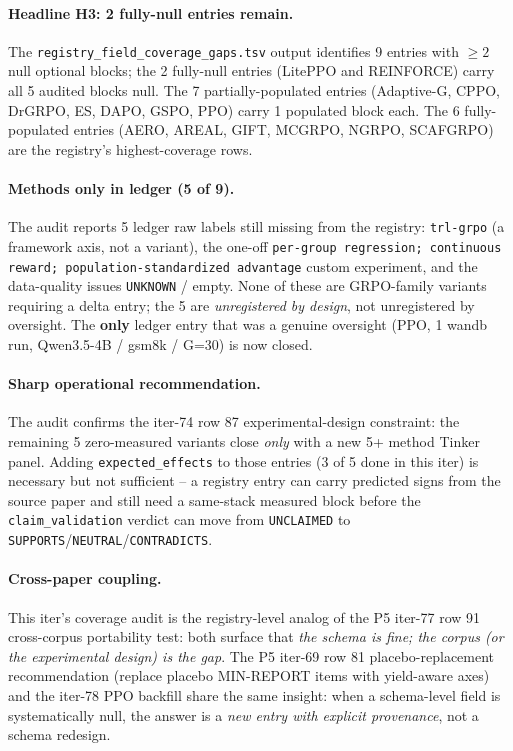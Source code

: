 \paragraph{Headline H3: 2 fully-null entries remain.}
The \texttt{registry\_field\_coverage\_gaps.tsv} output identifies
9 entries with $\geq 2$ null optional blocks; the 2 fully-null entries
(LitePPO and REINFORCE) carry all 5 audited blocks null. The 7
partially-populated entries (Adaptive-G, CPPO, DrGRPO, ES, DAPO,
GSPO, PPO) carry 1 populated block each. The 6 fully-populated
entries (AERO, AREAL, GIFT, MCGRPO, NGRPO, SCAFGRPO) are the
registry's highest-coverage rows.

\paragraph{Methods only in ledger (5 of 9).}
The audit reports 5 ledger raw labels still missing from the registry:
\texttt{trl-grpo} (a framework axis, not a variant), the one-off
\texttt{per-group regression; continuous reward;
population-standardized advantage} custom experiment, and the
data-quality issues \texttt{UNKNOWN} / empty. None of these are
GRPO-family variants requiring a delta entry; the 5 are
\emph{unregistered by design}, not unregistered by oversight. The
\textbf{only} ledger entry that was a genuine oversight (PPO, 1
wandb run, Qwen3.5-4B / gsm8k / G=30) is now closed.

\paragraph{Sharp operational recommendation.}
The audit confirms the iter-74 row 87 experimental-design
constraint: the remaining 5 zero-measured variants close \emph{only}
with a new 5+ method Tinker panel. Adding \texttt{expected\_effects}
to those entries (3 of 5 done in this iter) is necessary but not
sufficient -- a registry entry can carry predicted signs from the
source paper and still need a same-stack measured block before the
\texttt{claim\_validation} verdict can move from \texttt{UNCLAIMED}
to \texttt{SUPPORTS}/\texttt{NEUTRAL}/\texttt{CONTRADICTS}.

\paragraph{Cross-paper coupling.}
This iter's coverage audit is the registry-level analog of the
P5 iter-77 row 91 cross-corpus portability test: both surface that
\emph{the schema is fine; the corpus (or the experimental design)
is the gap}. The P5 iter-69 row 81 placebo-replacement
recommendation (replace placebo MIN-REPORT items with yield-aware
axes) and the iter-78 PPO backfill share the same insight: when a
schema-level field is systematically null, the answer is a
\emph{new entry with explicit provenance}, not a schema redesign.

